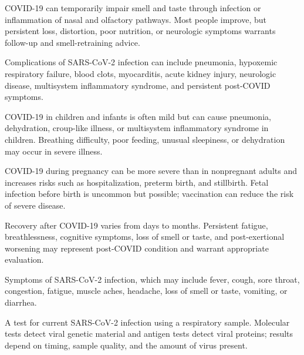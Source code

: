 
 COVID-19 can temporarily impair smell and taste through infection or inflammation of nasal and olfactory pathways. Most people improve, but persistent loss, distortion, poor nutrition, or neurologic symptoms warrants follow-up and smell-retraining advice.

 Complications of SARS-CoV-2 infection can include pneumonia, hypoxemic respiratory failure, blood clots, myocarditis, acute kidney injury, neurologic disease, multisystem inflammatory syndrome, and persistent post-COVID symptoms.


 COVID-19 in children and infants is often mild but can cause pneumonia, dehydration, croup-like illness, or multisystem inflammatory syndrome in children. Breathing difficulty, poor feeding, unusual sleepiness, or dehydration may occur in severe illness.


 COVID-19 during pregnancy can be more severe than in nonpregnant adults and increases risks such as hospitalization, preterm birth, and stillbirth. Fetal infection before birth is uncommon but possible; vaccination can reduce the risk of severe disease.

 Recovery after COVID-19 varies from days to months. Persistent fatigue, breathlessness, cognitive symptoms, loss of smell or taste, and post-exertional worsening may represent post-COVID condition and warrant appropriate evaluation.


 Symptoms of SARS-CoV-2 infection, which may include fever, cough, sore throat, congestion, fatigue, muscle aches, headache, loss of smell or taste, vomiting, or diarrhea.


 A test for current SARS-CoV-2 infection using a respiratory sample. Molecular tests detect viral genetic material and antigen tests detect viral proteins; results depend on timing, sample quality, and the amount of virus present.


